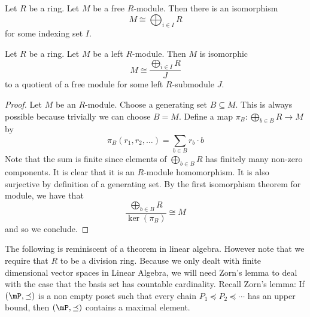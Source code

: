 \documentclass[a4paper]{article}
\begin{document}
\begin{prp}{}{} Let $R$ be a ring. Let $M$ be a free $R$-module. Then there is an isomorphism $$M\cong\bigoplus_{i\in I}R$$ for some indexing set $I$. 
\end{prp}

\begin{lmm}{}{} Let $R$ be a ring. Let $M$ be a left $R$-module. Then $M$ is isomorphic $$M\cong\frac{\bigoplus_{i\in I}R}{J}$$ to a quotient of a free module for some left $R$-submodule $J$. 
\begin{proof}
Let $M$ be an $R$-module. Choose a generating set $B\subseteq M$. This is always possible because trivially we can choose $B=M$. Define a map $\pi_B:\bigoplus_{b\in B}R\to M$ by $$\pi_B(r_1,r_2,\dots)=\sum_{b\in B}r_b\cdot b$$ Note that the sum is finite since elements of $\bigoplus_{b\in B}R$ has finitely many non-zero components. It is clear that it is an $R$-module homomorphism. It is also surjective by definition of a generating set. By the first isomorphism theorem for module, we have that $$\frac{\bigoplus_{b\in B}R}{\ker(\pi_B)}\cong M$$ and so we conclude. 
\end{proof}
\end{lmm}

The following is reminiscent of a theorem in linear algebra. However note that we require that $R$ to be a division ring. Because we only dealt with finite dimensional vector spaces in Linear Algebra, we will need Zorn's lemma to deal with the case that the basis set has countable cardinality. Recall Zorn's lemma: If $(\mP,\preceq)$ is a non empty poset such that every chain $P_1\preceq P_2\preceq\cdots$ has an upper bound, then $(\mP,\preceq)$ contains a maximal element. 
\end{document}
